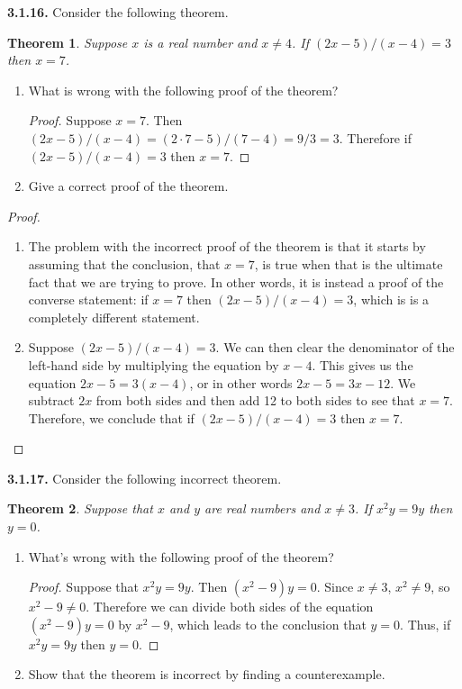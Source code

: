 \documentclass[12pt]{amsart}
\newenvironment{statement}[1]{\smallskip\noindent\color[rgb]{.6627, .3529, .6314} {\bf #1.}}{}
\newtheorem{theorem}{Theorem}
\theoremstyle{definition}
\theoremstyle{remark}
\begin{document}
\begin{statement}{3.1.16}
Consider the following theorem.
\begin{theorem}
	Suppose $x$ is a real number and $x \neq 4$.
	If $(2x - 5) / (x - 4) = 3$ then $x = 7$.
\end{theorem}
\begin{enumerate}
	\item What is wrong with the following proof of the theorem?
	\begin{proof}
		Suppose $x = 7$.
		Then $(2x - 5) / (x - 4) = (2 \cdot 7 - 5) / (7 - 4) = 9/3 = 3$.
		Therefore if $(2x - 5) / (x - 4) = 3$ then $x = 7$.
	\end{proof}
	
	\item Give a correct proof of the theorem.
\end{enumerate}
\end{statement}

\begin{proof}
\hfill
\begin{enumerate}
	\item The problem with the incorrect proof of the theorem is that it starts
	by assuming that the conclusion, that $x = 7$, is true when that is the ultimate fact
	that we are trying to prove.
	In other words, it is instead a proof of the converse statement: if $x = 7$ then
	$(2x - 5) / (x - 4) = 3$, which is is a completely different statement.
	
	\item Suppose $(2x - 5) / (x - 4) = 3$.
	We can then clear the denominator of the left-hand side by multiplying the equation by $x - 4$.
	This gives us the equation $2x - 5 = 3(x - 4)$, or in other words $2x - 5 = 3x - 12$.
	We subtract $2x$ from both sides and then add 12 to both sides to see that $x = 7$.
	Therefore, we conclude that if $(2x - 5) / (x - 4) = 3$ then $x = 7$.
\end{enumerate}
\end{proof}


\begin{statement}{3.1.17}
Consider the following incorrect theorem.
\begin{theorem}
	Suppose that $x$ and $y$ are real numbers and $x \neq 3$.
	If $x^2y = 9y$ then $y = 0$.
\end{theorem}
\begin{enumerate}
	\item What's wrong with the following proof of the theorem?
	\begin{proof}
		Suppose that $x^2y = 9y$.
		Then $(x^2 - 9)y = 0$.
		Since $x \neq 3$, $x^2 \neq 9$, so $x^2 - 9 \neq 0$.
		Therefore we can divide both sides of the equation $(x^2 - 9)y = 0$ by $x^2 - 9$,
		which leads to the conclusion that $y = 0$.
		Thus, if $x^2y = 9y$ then $y = 0$.
	\end{proof}
	
	\item Show that the theorem is incorrect by finding a counterexample.
\end{enumerate}
\end{statement}
\end{document}
